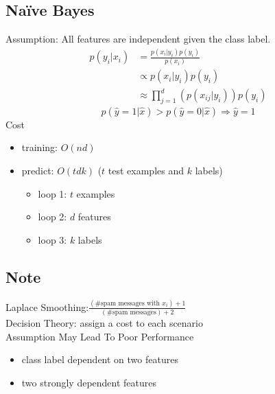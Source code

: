 \documentclass[10pt,landscape,a4paper]{article}
\begin{document}
\begin{multicols*}{5}
\section{Naïve Bayes}
Assumption: All features are independent given the class label.
\begin{align*}
    p(y_i|x_i) &= \frac{p(x_i|y_i) p(y_i)}{p(x_i)} \\
    &\propto p(x_i|y_i) p(y_i) \\
    &\approx \prod_{j=1}^{d} (p(x_{ij}|y_i)) p(y_i)
\end{align*}
\begin{equation*}
    p(\hat{y} = 1|\hat{x}) > p(\hat{y}=0|\hat{x}) \Rightarrow \hat{y} = 1
\end{equation*}
Cost
\begin{itemize}
    \item training: \(O(nd)\)
    \item predict: \(O(tdk)\) (\(t\) test examples and \(k\) labels)
    \begin{itemize}
        \item loop 1: \(t\) examples
        \item loop 2: \(d\) features
        \item loop 3: \(k\) labels
    \end{itemize}
\end{itemize}
\subsection{Note}
Laplace Smoothing:\(\frac{(\text{\# spam messages with } x_i)+1}{(\text{\# spam messages})+2}\) \\
Decision Theory: assign a cost to each scenario \\
Assumption May Lead To Poor Performance \\
\begin{itemize}
    \item class label dependent on two features
    \item two strongly dependent features
\end{itemize}



\end{multicols*}
\end{document}
